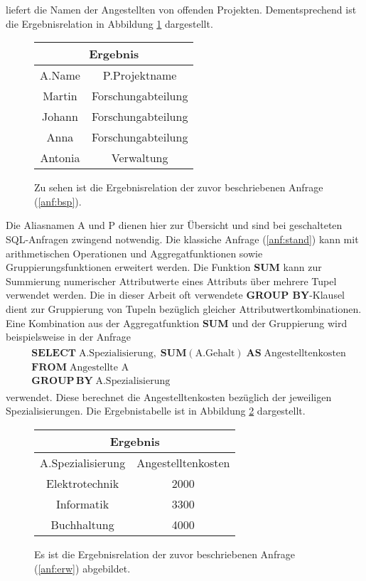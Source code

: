 liefert die Namen der Angestellten von offenden Projekten. Dementsprechend ist die Ergebnisrelation in Abbildung \ref{abb:result_relation} dargestellt.
\begin{figure}[h]
    \centering
\begin{tabular}{|c|c|} \hline
    \multicolumn{2}{|c|}{\textbf{Ergebnis}} \\ \hline
    \hline
    A.Name & P.Projektname \\ 
    \hline
    Martin &Forschungabteilung \\ 
    \hline
    Johann &Forschungabteilung\\
    \hline
    Anna &Forschungabteilung\\ 
    \hline
    Antonia &Verwaltung \\
    \hline
\end{tabular}
\caption{Zu sehen ist die Ergebnisrelation der zuvor beschriebenen Anfrage (\ref{anf:bsp}).}
\label{abb:result_relation}
\end{figure}
Die Aliasnamen \glqq A\grqq{} und \glqq P\grqq{} dienen hier zur Übersicht und sind bei geschalteten SQL-Anfragen zwingend notwendig. Die klassiche Anfrage (\ref{anf:stand}) kann mit arithmetischen Operationen und Aggregatfunktionen sowie Gruppierungsfunktionen erweitert werden. Die Funktion \textbf{SUM} kann zur Summierung numerischer Attributwerte eines Attributs über mehrere Tupel verwendet werden. Die in dieser Arbeit oft verwendete \textbf{GROUP BY}-Klausel dient zur Gruppierung von Tupeln bezüglich gleicher Attributwertkombinationen. Eine Kombination aus der Aggregatfunktion \textbf{SUM} und der Gruppierung wird beispielsweise in der Anfrage
\begin{align}
    \label{anf:erw}
    \begin{split}
        & \mathbf{SELECT} \; \text{A.Spezialisierung}, \; \mathbf{SUM}(\text{A.Gehalt}) \; \mathbf{AS} \; \text{Angestelltenkosten}\\
        & \mathbf{FROM} \; \text{Angestellte A} \\
        &\mathbf{GROUP} \, \mathbf{BY} \; \text{A.Spezialisierung}
    \end{split}
\end{align}
verwendet. Diese berechnet die Angestelltenkosten bezüglich der jeweiligen Spezialisierungen. Die Ergebnistabelle ist in Abbildung \ref{abb:erg_erw} dargestellt.
\begin{figure}[h]
    \centering
\begin{tabular}{|c|c|} \hline
    \multicolumn{2}{|c|}{\textbf{Ergebnis}} \\ \hline
    \hline
    A.Spezialisierung &Angestelltenkosten\\ 
    \hline
    Elektrotechnik &2000 \\ 
    \hline
    Informatik &3300\\
    \hline
    Buchhaltung &4000\\ 
    \hline
\end{tabular}
\caption{Es ist die Ergebnisrelation der zuvor beschriebenen Anfrage (\ref{anf:erw})
\label{abb:erg_erw} abgebildet.}
\end{figure}
